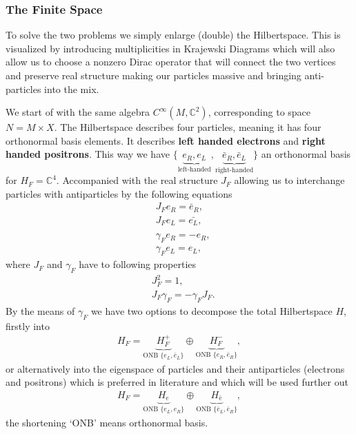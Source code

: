 \subsubsection{The Finite Space}
To solve the two problems we simply enlarge (double) the Hilbertspace. This
is visualized by introducing multiplicities in Krajewski Diagrams
\cite{ncgwalter} which will also allow us to choose a nonzero Dirac operator
that will connect the two vertices and preserve real structure making our
particles massive and bringing anti-particles into the mix.

We start of with the same algebra $C^\infty(M, \mathbb{C}^2)$, corresponding
to space $N= M\times X$. The Hilbertspace describes four particles, meaning
it has four orthonormal basis elements. It describes \textbf{left handed
electrons} and \textbf{right handed positrons}. This way we have
$\{ \underbrace{e_R, e_L}_{\text{left-handed}}, \underbrace{\bar{e}_R,
\bar{e}_L}_{\text{right-handed}}\}$ an orthonormal basis for $H_F =
\mathbb{C}^4$. Accompanied with the real structure $J_F$ allowing us to
interchange particles with antiparticles by the following equations
\begin{align}
    &J_F e_R = \bar{e}_R, \\
    &J_F e_L = \bar{e_L}, \\
    \nonumber \\
    &\gamma _F e_R = -e_R,\\
    &\gamma_F e_L = e_L,
\end{align}
where $J_F$ and $\gamma_F$ have to following properties
\begin{align}
    &J_F^2 = 1,\\
    & J_F \gamma_F  = - \gamma_F J_F.
\end{align}
By the means of $\gamma_F$ we have two options to decompose the total
Hilbertspace $H$, firstly into
\begin{align}
    H_F = \underbrace{H_F^+}_{\text{ONB } \{e_L, \bar{e}_L\}}
    \oplus \underbrace{H_F^-}_{\text{ONB } \{e_R, \bar{e}_R\}},
\end{align}
or alternatively into the eigenspace of particles and their
antiparticles (electrons and positrons) which is preferred in literature and
which will be used further out
\begin{align}
    H_F = \underbrace{H_{e}}_{\text{ONB } \{e_L, e_R\}} \oplus
    \underbrace{H_{\bar{e}}}_{\text{ONB } \{\bar{e}_L, \bar{e}_R\}},
\end{align}
the shortening `ONB' means orthonormal basis.


